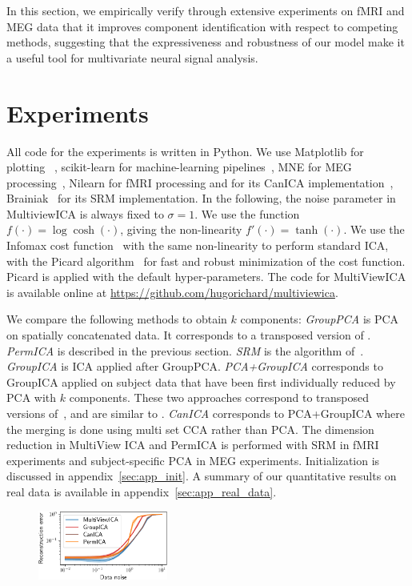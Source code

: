 In this section, we empirically verify through extensive experiments on fMRI and MEG data that it improves component identification with respect to competing methods, suggesting that the expressiveness and robustness of our model make it a useful tool for multivariate neural signal analysis.

\section{Experiments}
\label{sec:expts}
All code for the experiments is written in Python.
%
We use Matplotlib for plotting~\cite{hunter2007matplotlib} , scikit-learn for
machine-learning pipelines~\cite{pedregosa2011scikit}, MNE for MEG
processing~\cite{gramfort2013meg}, Nilearn for fMRI processing and for its CanICA implementation~\cite{abraham2014machine}, Brainiak~\cite{kumar2020brainiak} for its SRM implementation. 
%
In the following, the noise parameter in MultiviewICA is always fixed to $\sigma =1$.
%
We use the function $f(\cdot)= \log\cosh(\cdot)$, giving the non-linearity $f'(\cdot) = \tanh(\cdot)$.
%
We use the Infomax cost function~\cite{bell1995information} with the same non-linearity to perform standard ICA, with the Picard algorithm~\cite{ablin2018faster} for fast and robust minimization of the cost function. Picard is applied with the default hyper-parameters.
%
The code for MultiViewICA is available online at \url{https://github.com/hugorichard/multiviewica}.
%

We compare the following methods to obtain $k$ components:
%
\emph{GroupPCA} is PCA on spatially concatenated data. It corresponds to a transposed version of \cite{smith2014group}.
%
\emph{PermICA} is described in the previous section.
%
\emph{SRM} is  the algorithm of~\cite{chen2015reduced}.
%
\emph{GroupICA} is ICA applied after GroupPCA.
%
\emph{PCA+GroupICA} corresponds to GroupICA applied on subject data that have been first individually reduced by PCA with $k$ components. 
%
These two approaches correspond to transposed versions of~\cite{calhoun2001fmri}, and are similar to \cite{eichele2011eegift}.
\emph{CanICA} corresponds to PCA+GroupICA where the merging is done using multi set CCA rather than PCA. The dimension reduction in MultiView ICA and PermICA is performed with SRM in fMRI experiments and subject-specific PCA in MEG experiments. Initialization is discussed in appendix~\ref{sec:app_init}. A summary of our quantitative results on real data is available in appendix~\ref{sec:app_real_data}.

\begin{figure}
\label{fig:synth}
\includegraphics[width=0.38\textwidth]{figures/mvica/distance_expe.pdf}
\end{figure}

